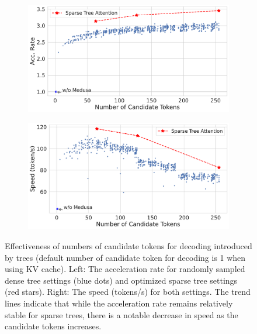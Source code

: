 \begin{figure}[ht]
     \centering
     \begin{subfigure}[b]{0.45\textwidth}
         \centering
         \includegraphics[width=\textwidth]{sparse_acc.pdf}
         \caption{}
         \label{fig:sparse_acc}
     \end{subfigure}
     \begin{subfigure}[b]{0.45\textwidth}
         \centering
         \includegraphics[width=\textwidth]{sparse_speed.pdf}
         \caption{}
         \label{fig:sparse_speed}
     \end{subfigure}
\vspace{-4mm}
        \caption{Effectiveness of numbers of candidate tokens for decoding introduced by trees (default number of candidate token for decoding is 1 when using KV cache). Left: The acceleration rate for randomly sampled dense tree settings (blue dots) and optimized sparse tree settings (red stars). Right: The speed (tokens/s) for both settings. The trend lines indicate that while the \textcolor{black}{acceleration} rate remains relatively stable for sparse trees, there is a notable decrease in speed as the candidate tokens increases.}
        \label{fig:sparse_tree_ablation}
\end{figure}

